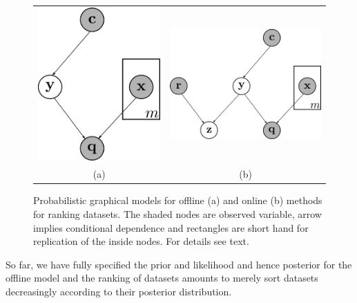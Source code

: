 \documentclass[twoside,11pt]{article}
\begin{document}
\begin{figure}
\centering
\begin{tabular}{cc}
\includegraphics[scale=0.7]{offline-pgm.png} \hspace{0.3in} & \includegraphics[scale=0.7]{online-pgm.png}\\
(a) & (b)
\end{tabular}
\caption{Probabilistic graphical models for offline (a) and online (b) methods for ranking datasets. The shaded nodes are observed variable, arrow implies conditional dependence and rectangles are short hand for replication of the inside nodes. For details see text.}\label{fig:pgm}
\end{figure}
So far, we have fully specified the prior and likelihood and hence posterior for the offline model and the ranking of datasets amounts to merely sort datasets decreasingly according to their posterior distribution.
\end{document}
